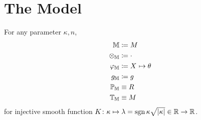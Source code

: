 \documentclass[../main.tex]{subfiles}
\begin{document}
\section{The Model}
\begin{ModelGroupElement}
For any parameter $\kappa, n$,
\begin{align*}
\elements&\coloneqq M\\
\groupoperation{\elements}&\coloneqq\cdot\\
\charts{\elements}&\coloneqq\tensor{X}{}\mapsto\tensor{\theta}{}\\
\innerprod{\elements}&\coloneqq g\\
\points{\elements}&\equiv R\\
\transformations{\elements}&\equiv M\\
\end{align*}
for injective smooth function $K\colon\kappa\mapsto\lambda=\operatorname{sgn}{\kappa}\sqrt{\lvert\kappa\rvert}\in\mathbb{R}\to\mathbb{R}$.
\end{ModelGroupElement}
\begin{ModelGroupAssertion}
\end{ModelGroupAssertion}
\begin{ModelCurvatureAssertion}
\end{ModelCurvatureAssertion}
\end{document}
